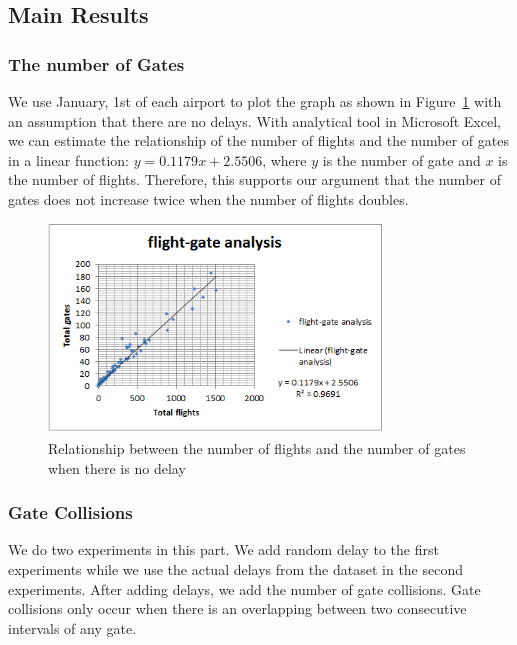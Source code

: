 \documentclass[11pt,a4paper]{article}
\begin{document}

\subsection{Main Results}
\label{subsec:expo-resu}
\subsubsection{The number of Gates} We use January, 1st of each airport to plot the graph as shown in Figure~\ref{fig:gate-flight-nodelay} with an assumption that there are no delays. With analytical tool in Microsoft Excel, we can estimate the relationship of the number of flights and the number of gates in a linear function: $y = 0.1179x + 2.5506$, where $y$ is the number of gate and $x$ is the number of flights. Therefore, this supports our argument that the number of gates does not increase twice when the number of flights doubles.\begin{figure}
    \centering
    \includegraphics[width=0.8\textwidth]{img-gate-flight-nodelay.png}
    \caption{Relationship between the number of flights and the number of gates when there is no delay}
    \label{fig:gate-flight-nodelay}
\end{figure}

\subsubsection{Gate Collisions} We do two experiments in this part. We add random delay to the first experiments while we use the actual delays from the dataset in the second experiments. After adding delays, we add the number of gate collisions. Gate collisions only occur when there is an overlapping between two consecutive intervals of any gate.
\end{document}
